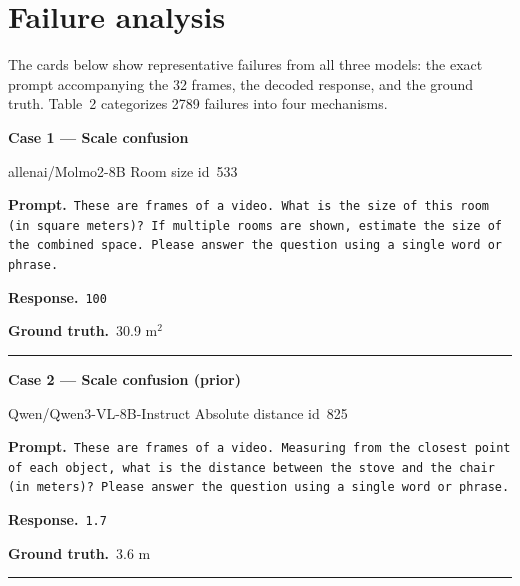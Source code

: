 \documentclass{article}
\begin{document}
\section{Failure analysis}
The cards below show representative failures from all three models: the exact prompt accompanying the
32 frames, the decoded response, and the ground truth. Table~2 categorizes 2789 failures into four mechanisms.

\noindent
\begin{minipage}[t]{0.485\textwidth}\raggedright
\noindent\textbf{Case 1 --- Scale confusion}\par
{\scriptsize allenai/Molmo2-8B \quad\textbar\quad Room size \quad\textbar\quad id~533}\par\vspace{0.5pt}
{\fontsize{6.5}{7.8}\selectfont\raggedright\setlength{\parindent}{0pt}
\textbf{Prompt.}\ \texttt{These are frames of a video.\newline
What is the size of this room (in square meters)? \newline
If multiple rooms are shown, estimate the size of the combined space.\newline
Please answer the question using a single word or phrase.}\par\vspace{0.5pt}
\textbf{Response.}\ \texttt{100}\par\vspace{0.5pt}
\textbf{Ground truth.}\ 30.9 m$^2$\par}
\vspace{0.5pt}\hrule\vspace{1.5pt}
\end{minipage}\hfill
\begin{minipage}[t]{0.485\textwidth}\raggedright
\noindent\textbf{Case 2 --- Scale confusion (prior)}\par
{\scriptsize Qwen/Qwen3-VL-8B-Instruct \quad\textbar\quad Absolute distance \quad\textbar\quad id~825}\par\vspace{0.5pt}
{\fontsize{6.5}{7.8}\selectfont\raggedright\setlength{\parindent}{0pt}
\textbf{Prompt.}\ \texttt{These are frames of a video.\newline
Measuring from the closest point of each object, what is the distance between the stove and the chair (in meters)?\newline
Please answer the question using a single word or phrase.}\par\vspace{0.5pt}
\textbf{Response.}\ \texttt{1.7}\par\vspace{0.5pt}
\textbf{Ground truth.}\ 3.6 m\par}
\vspace{0.5pt}\hrule\vspace{1.5pt}
\end{minipage}
\end{document}

